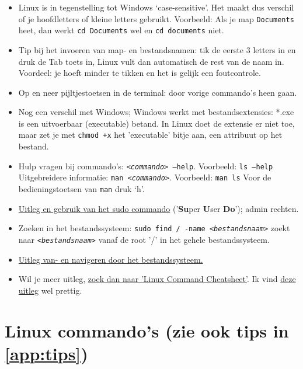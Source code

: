 \begin{itemize}
	\item 
	Linux is in tegenstelling tot Windows ‘case-sensitive’. Het maakt dus verschil of je hoofdletters of kleine letters gebruikt. Voorbeeld: Als je map \texttt{Documents} heet, dan werkt \texttt{cd Documents} wel en \texttt{cd documents} niet.
	\item 
	Tip bij het invoeren van map- en bestandsnamen: tik de eerste 3 letters in en druk de Tab toets in, Linux vult dan automatisch de rest van de naam in. Voordeel: je hoeft minder te tikken en het is gelijk een foutcontrole.
	\item 
	Op en neer pijltjestoetsen in de terminal: door vorige commando's heen gaan.
	\item
	Nog een verschil met Windows; Windows werkt met bestandsextensies: *.exe is een uitvoerbaar (executable) betand. In Linux doet de extensie er niet toe, maar zet je met \texttt{chmod +x} het 'executable' bitje aan, een attribuut op het bestand.
	\item  
	Hulp vragen bij commando’s: \texttt{<\textit{commando}> --help}. Voorbeeld: \texttt{ls  --help}
	Uitgebreidere informatie: \texttt{man <\textit{commando}>}. Voorbeeld: \texttt{man ls}\newline
	Voor de bedieningstoetsen van \texttt{man} druk ‘h’.
	\item 
	\href{https://phoenixnap.com/kb/linux-sudo-command}{Uitleg en gebruik van het sudo commando}  ('\textbf{Su}per \textbf{U}ser \textbf{Do}'); admin rechten.
	\item
	Zoeken in het bestandssysteem: \texttt{sudo find / -name \textit{<bestandsnaam>}}
	zoekt naar \texttt{\textit{<bestandsnaam>}} vanaf de root '/' in het gehele bestandssysteem.
	\item 
	\href{https://linuxconfig.org/filesystem-basics}{Uitleg van- en navigeren door het bestandssysteem.}
	\item
	Wil je meer uitleg, \href{https://duckduckgo.com/?q=linux+command+cheatsheet}{zoek dan naar 'Linux Command Cheatsheet'}. \newline
	Ik vind \href{https://linuxconfig.org/linux-commands-cheat-sheet}{deze uitleg} wel prettig.
\end{itemize}

\break
\section{Linux commando's (zie ook tips in \ref{app:tips})}\label{app:commands}

